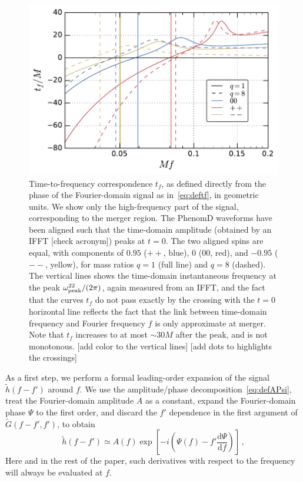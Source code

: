 \documentclass[aps,showpacs,twocolumn,
prd,superscriptaddress,nofootinbib]{revtex4-1}
\newcommand{\be}{\begin{equation}}
\newcommand{\ee}{\end{equation}}
\newcommand\ud{{\mathrm{d}}}
\newcommand{\SM}[1]{{\color{Red} #1}}
\begin{document}
\begin{figure}
  \centering
  \includegraphics[width=.98\linewidth]{plots/tf_py.pdf}
  \caption{Time-to-frequency correspondence $t_{f}$, as defined directly from the phase of the Fourier-domain signal as in~\eqref{eq:deftf}, in geometric units. We show only the high-frequency part of the signal, corresponding to the merger region. The PhenomD waveforms have been aligned such that the time-domain amplitude (obtained by an IFFT \SM{[check acronym]}) peaks at $t=0$. The two aligned spins are equal, with components of $0.95$ ($++$, blue), $0$ ($00$, red), and $-0.95$ ($--$, yellow), for mass ratios $q=1$ (full line) and $q=8$ (dashed). The vertical lines shows the time-domain instantaneous frequency at the peak $\omega^{22}_{\rm peak}/(2\pi)$, again measured from an IFFT, and the fact that the curves $t_{f}$ do not pass exactly by the crossing with the $t=0$ horizontal line reflects the fact that the link between time-domain frequency and Fourier frequency $f$ is only approximate at merger. Note that $t_{f}$ increases to at most $\sim 30M$ after the peak, and is not monotonous. \SM{[add color to the vertical lines]} \SM{[add dots to highlights the crossings]}}
  \label{fig:tf}
\end{figure}

As a first step, we perform a formal leading-order expansion of the signal $\tilde{h}(f-f')$ around $f$. We use the amplitude/phase decomposition~\eqref{eq:defAPsi}, treat the Fourier-domain amplitude $A$ as a constant, expand the Fourier-domain phase $\Psi$ to the first order, and discard the $f'$ dependence in the first argument of $\tilde{G}(f-f', f')$, to obtain
\be
	\tilde{h}(f-f') \simeq A(f) \exp\left[ -i\left( \Psi(f) - f' \frac{\ud \Psi}{\ud f} \right) \right] \,,
\ee
Here and in the rest of the paper, such derivatives with respect to the frequency will always be evaluated at $f$.
\end{document}
